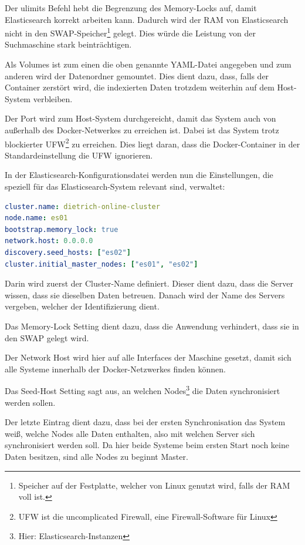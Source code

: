 Der ulimits Befehl hebt die Begrenzung des Memory-Locks auf, damit Elasticsearch korrekt arbeiten kann. Dadurch wird der RAM von Elasticsearch nicht in den SWAP-Speicher\footnote{Speicher auf der Festplatte, welcher von Linux genutzt wird, falls der RAM voll ist.} gelegt. Dies würde die Leistung von der Suchmaschine stark beinträchtigen.

Als Volumes ist zum einen die oben genannte YAML-Datei angegeben und zum anderen wird der Datenordner gemountet. Dies dient dazu, dass, falls der Container zerstört wird, die indexierten Daten trotzdem weiterhin auf dem Host-System verbleiben.

Der Port wird zum Host-System durchgereicht, damit das System auch von außerhalb des Docker-Netwerkes zu erreichen ist. Dabei ist das System trotz blockierter UFW\footnote{UFW ist die uncomplicated Firewall, eine Firewall-Software für Linux} zu erreichen. Dies liegt daran, dass die Docker-Container in der Standardeinstellung die UFW ignorieren.

In der Elasticsearch-Konfigurationsdatei werden nun die Einstellungen, die speziell für das Elasticsearch-System relevant sind, verwaltet: 

\begin{lstlisting}[language=YAML, frame=single, label={lst:es01-yml}, caption=Auschnitt aus der Konfigurationsdatei von Elasticsearch,captionpos=b] 
cluster.name: dietrich-online-cluster
node.name: es01
bootstrap.memory_lock: true
network.host: 0.0.0.0
discovery.seed_hosts: ["es02"]
cluster.initial_master_nodes: ["es01", "es02"]
\end{lstlisting}

Darin wird zuerst der Cluster-Name definiert. Dieser dient dazu, dass die Server wissen, dass sie dieselben Daten betreuen. 
Danach wird der Name des Servers vergeben, welcher der Identifizierung dient.

Das Memory-Lock Setting dient dazu, dass die Anwendung verhindert, dass sie in den SWAP gelegt wird.

Der Network Host wird hier auf alle Interfaces der Maschine gesetzt, damit sich alle Systeme innerhalb der Docker-Netzwerkes finden können.

Das Seed-Host Setting sagt aus, an welchen Nodes\footnote{Hier: Elasticsearch-Instanzen} die Daten synchronisiert werden sollen.

Der letzte Eintrag dient dazu, dass bei der ersten Synchronisation das System weiß, welche Nodes alle Daten enthalten, also mit welchen Server sich synchronisiert werden soll. Da hier beide Systeme beim ersten Start noch keine Daten besitzen, sind alle Nodes zu beginnt Master. 


